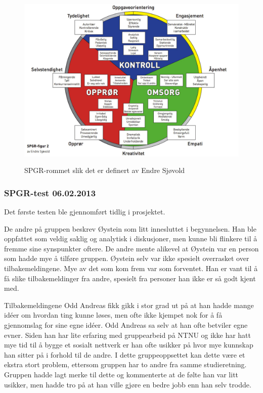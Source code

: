 \documentclass[a4paper,norsk,oneside]{article}
\begin{document}
\begin{figure}[H]
\centering
\includegraphics[scale=0.25]{figs/spgrfigur2}
\label{spgr}
\caption{SPGR-rommet slik det er definert av Endre Sjøvold}
\end{figure}

\clearpage




\subsubsection{SPGR-test 06.02.2013}
Det første testen ble gjennomført tidlig i prosjektet. 

De andre på gruppen beskrev Øystein som litt innesluttet i begynnelsen. Han ble oppfattet som veldig saklig og analytisk i diskusjoner, men kunne bli flinkere til å fremme sine synspunkter oftere. De andre mente alikevel at Øystein var en person som hadde mye å tilføre gruppen. Øystein selv var ikke spesielt overrasket over tilbakemeldingene. Mye av det som kom frem var som forventet. Han er vant til å få slike tilbakemeldinger fra andre, spesielt fra personer han ikke er så godt kjent med.

Tilbakemeldingene Odd Andreas fikk gikk i stor grad ut på at han hadde mange idéer om hvordan ting kunne løses, men ofte ikke kjempet nok for å få gjennomslag for sine egne idéer.
Odd Andreas sa selv at han ofte betviler egne evner. Siden han har lite erfaring med gruppearbeid på NTNU og ikke har hatt mye tid til å bygge et sosialt nettverk er han ofte usikker på hvor mye kunnskap han sitter på i forhold til de andre. I dette gruppeoppsettet kan dette være et ekstra stort problem, ettersom gruppen har to andre fra samme studieretning. Gruppen hadde lagt merke til dette og kommenterte at de følte han var litt usikker, men hadde tro på at han ville gjøre en bedre jobb enn han selv trodde.
\end{document}
